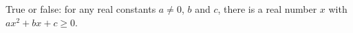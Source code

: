 True or false: for any real constants $a\neq0$, $b$ and $c$, there is a real number $x$ with $ax^2+bx+c\ge0$.
